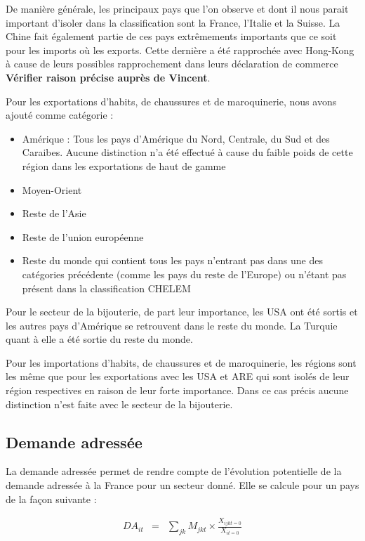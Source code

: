 \documentclass[french,10pt,a4paper]{article}
\begin{document}
De manière générale, les principaux pays que l'on observe et dont il nous parait important d'isoler dans la classification sont la France, l'Italie et la Suisse. La Chine fait également partie de ces pays extrêmements importants que ce soit pour les imports où les exports. Cette dernière a été rapprochée avec Hong-Kong à cause de leurs possibles rapprochement dans leurs déclaration de commerce \textbf{Vérifier raison précise auprès de Vincent}.

Pour les exportations d'habits, de chaussures et de maroquinerie, nous avons ajouté comme catégorie :

\begin{itemize}
  \item Amérique : Tous les pays d'Amérique du Nord, Centrale, du Sud et des Caraibes. Aucune distinction n'a été effectué à cause du faible poids de cette région dans les exportations de haut de gamme
  \item Moyen-Orient
  \item Reste de l'Asie
  \item Reste de l'union européenne
  \item Reste du monde qui contient tous les pays n'entrant pas dans une des catégories précédente (comme les pays du reste de l'Europe) ou n'étant pas présent dans la classification CHELEM
\end{itemize}

Pour le secteur de la bijouterie, de part leur importance, les USA ont été sortis et les autres pays d'Amérique se retrouvent dans le reste du monde. La Turquie quant à elle a été sortie du reste du monde.

Pour les importations d'habits, de chaussures et de maroquinerie, les régions sont les même que pour les exportations avec les USA et ARE qui sont isolés de leur région respectives en raison de leur forte importance. Dans ce cas précis aucune distinction n'est faite avec le secteur de la bijouterie.

\subsection{Demande adressée}

La demande adressée permet de rendre compte de l'évolution potentielle de la demande adressée à la France pour un secteur donné. Elle se calcule pour un pays de la façon suivante :

\begin{eqnarray}
\label{eq:1}
DA_{it} & = & \sum_{jk}M_{jkt} \times \frac{X_{ijkt=0}}{X_{it=0}}
\end{eqnarray}
\end{document}
